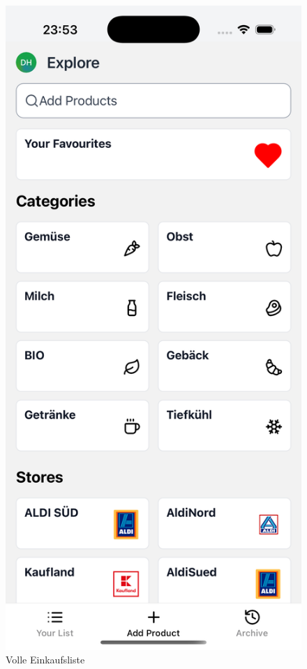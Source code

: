 \begin{figure}[h!]
\begin{minipage}[b]{0.23\textwidth}
        \caption*{Volle Einkaufsliste}
    \end{minipage}
    \hspace{0.01\textwidth}
    \begin{minipage}[b]{0.23\textwidth}
        \includegraphics[width=\textwidth]{media/explore.png}

\end{minipage}
\end{figure}
